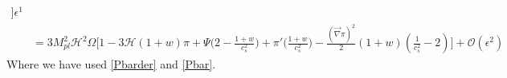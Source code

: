 \documentclass[a4paper,11pt]{article}
\begin{document}
\begin{align}
   \Big ] \epsilon^1
   \nonumber
 \\
  &
  =
3 M_{pl}^2  \mathcal{H}^2 \Omega \Bigg[  1-3\mathcal{H} (1+w)  \pi+ \Psi \Big (2 - \frac{1+w}{c_s^2}  \Big ) + {\pi'} \Big ( \frac{1+w}{c_s^2}   \Big)  - \frac{(\vec{\nabla} \pi)^2}{2}   (1+w) (\frac{1}{c_s^2}- 2 ) 
 \Bigg]+  \mathcal {O}(\epsilon^{2}) 
\end{align}
Where we have used \ref{Pbarder} and \ref{Pbar}.
\end{document}
